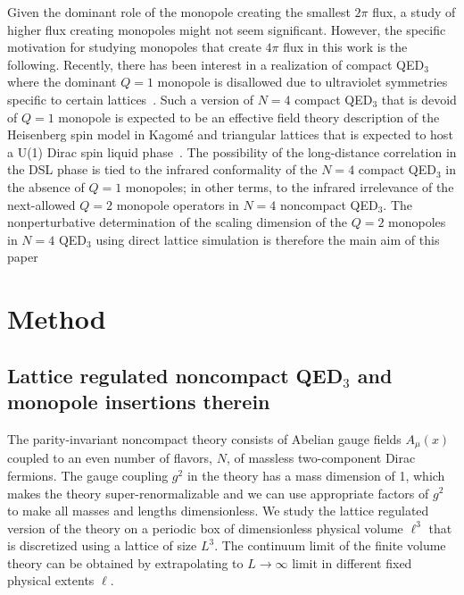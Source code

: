 \documentclass[prd, onecolumn, superscriptaddress, nofootinbib, notitlepage, floatfix]{revtex4-1}
\begin{document}
Given the dominant role of the monopole creating the smallest $2\pi$
flux, a study of higher flux creating monopoles might not seem
significant.  However, the specific motivation for studying monopoles
that create $4\pi$ flux in this work is the following.  Recently,
there has been interest in a realization of compact QED$_3$ where
the dominant $Q=1$ monopole is disallowed due to ultraviolet
symmetries specific to certain lattices~\cite{Song:2018ial}.  Such
a version of $N=4$ compact QED$_3$ that is devoid of $Q=1$ monopole
is expected to be an effective field theory description of the
Heisenberg spin model in Kagom\'e and triangular lattices that is
expected to host a U(1) Dirac spin liquid
phase~\cite{Song:2018ial,Song:2018ccm}. The possibility of the
long-distance correlation in the DSL phase is tied to the infrared
conformality of the $N=4$ compact QED$_3$ in the absence of $Q=1$
monopoles; in other terms, to the infrared irrelevance of the
next-allowed $Q=2$ monopole operators in $N=4$ noncompact QED$_3$.
The nonperturbative determination of the scaling dimension of the
$Q=2$ monopoles in $N=4$ QED$_3$ using direct lattice simulation
is therefore the main aim of this paper

\section{Method}\label{sec:method}

\subsection{Lattice regulated noncompact QED$_3$ and monopole insertions therein}

The parity-invariant noncompact theory consists of Abelian gauge
fields $A_\mu(x)$ coupled to an even number of flavors, $N$, of
massless two-component Dirac fermions.  The gauge coupling $g^2$
in the theory has a mass dimension of 1, which makes the theory
super-renormalizable and we can use appropriate factors of $g^2$ to make all
masses and lengths dimensionless. We study the lattice regulated
version of the theory on a periodic box of dimensionless physical
volume $\ell^3$ that is discretized using a lattice of size $L^3$.
The continuum limit of the finite volume theory can be obtained by
extrapolating to $L\to\infty$ limit in different fixed physical
extents $\ell$.
\end{document}
